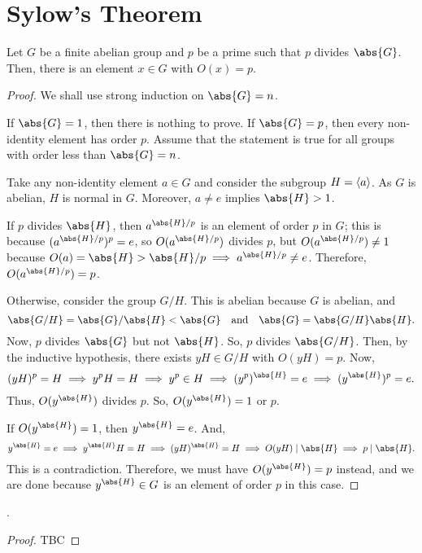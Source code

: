 \documentclass[11pt]{penrose}
\begin{document}
\section{Sylow's Theorem}
\begin{nthm}[Cauchy]
    Let $G$ be a finite abelian group and $p$ be a prime such that $p$ divides $\abs{G}$. Then, there is an element $x \in G$ with $O(x) = p$.
\end{nthm}
\begin{proof}
    We shall use strong induction on $\abs{G} = n$.

    If $\abs{G} = 1$, then there is nothing to prove. If $\abs{G} = p$, then every non-identity element has order $p$. Assume that the statement is true for all groups with order less than $\abs{G} = n$.

    Take any non-identity element $a \in G$ and consider the subgroup $H = \langle a\rangle$. As $G$ is abelian, $H$ is normal in $G$. Moreover, $a \neq e$ implies $\abs{H} > 1$.

    If $p$ divides $\abs{H}$, then $a^{\abs{H}/p}$ is an element of order $p$ in $G$; this is because $(a^{\abs{H}/p})^{p} = e$, so $O(a^{\abs{H}/p})$ divides $p$, but $O(a^{\abs{H}/p}) \neq 1$ because $O(a) = \abs{H} > \abs{H}/p \implies a^{\abs{H}/p} \neq e$. Therefore, $O(a^{\abs{H}/p}) = p$.

    Otherwise, consider the group $G/H$. This is abelian because $G$ is abelian, and
    \begin{equation*}
        \abs{G/H} = \abs{G} / \abs{H} < \abs{G}
        \quad\text{and}\quad
        \abs{G} = \abs{G/H} \abs{H}.
    \end{equation*}
    Now, $p$ divides $\abs{G}$ but not $\abs{H}$. So, $p$ divides $\abs{G/H}$. Then, by the inductive hypothesis, there exists $yH \in G/H$ with $O(yH) = p$. Now,
    \begin{equation*}
        (yH)^{p} = H
        \implies
        y^{p} H = H
        \implies
        y^{p} \in H
        \implies
        (y^{p})^{\abs{H}} = e
        \implies
        (y^{\abs{H}})^{p} = e.
    \end{equation*}
    Thus, $O(y^{\abs{H}})$ divides $p$. So, $O(y^{\abs{H}}) = 1$ or $p$.

    If $O(y^{\abs{H}}) = 1$, then $y^{\abs{H}} = e$. And,
    \begin{equation*}
        y^{\abs{H}} = e
        \implies
        y^{\abs{H}} H = H
        \implies
        (yH)^{\abs{H}} = H
        \implies
        O(yH) \mid \abs{H}
        \implies
        p \mid \abs{H}.
    \end{equation*}
    This is a contradiction. Therefore, we must have $O(y^{\abs{H}}) = p$ instead, and we are done because $y^{\abs{H}} \in G$ is an element of order $p$ in this case.
\end{proof}

\begin{nthm}[Sylow]
    .
\end{nthm}
\begin{proof}
    TBC
\end{proof}
\end{document}
